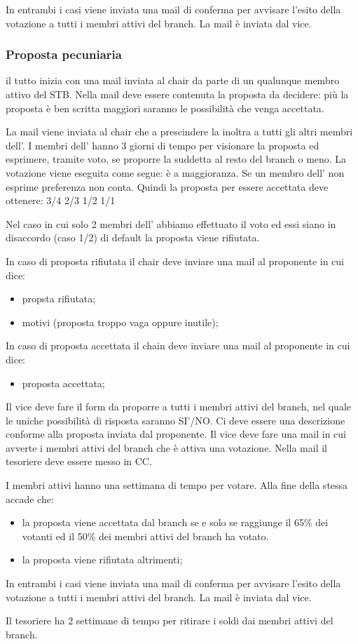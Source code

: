 \documentclass[pdf]{article}
\theoremstyle{definition}
\begin{document}
In entrambi i casi viene inviata una mail di conferma per  avvisare l'esito della votazione a tutti i membri attivi del branch. La mail è inviata dal vice.

\subsubsection{Proposta pecuniaria}

il tutto inizia con una mail inviata al chair da parte di un qualunque membro attivo del STB. Nella mail deve essere contenuta la proposta da decidere: più la proposta è ben scritta maggiori saranno le possibilità che venga accettata. 

La mail viene inviata al chair che a prescindere la inoltra a tutti gli altri membri dell'\EC{}. I membri dell'\EC{} hanno 3 giorni di tempo per visionare la proposta ed esprimere, tramite voto, se proporre la suddetta al resto del branch o meno.
La votazione viene eseguita come segue:
è a maggioranza. Se un membro dell'\EC{} non esprime preferenza non conta. Quindi la proposta per essere accettata deve ottenere:
3/4
2/3
1/2
1/1

Nel caso in cui solo 2 membri dell'\EC{} abbiamo effettuato il voto ed essi siano in disaccordo (caso 1/2) di default la proposta viene rifiutata.

In caso di proposta rifiutata il chair deve inviare una mail al proponente in cui dice:
\begin{itemize}
	\item propsta rifiutata;
	\item motivi (proposta troppo vaga oppure inutile);
\end{itemize}

In caso di proposta accettata il chain deve inviare una mail al proponente in cui dice:
\begin{itemize}
	\item proposta accettata;
\end{itemize}

Il vice deve fare il form da proporre a tutti i membri attivi del branch, nel quale le uniche possibilità di risposta saranno SI'/NO. Ci deve essere una descrizione conforme alla proposta inviata dal proponente. 
Il vice deve fare una mail in cui avverte i membri attivi del branch che è attiva una votazione. Nella mail il tesoriere deve essere messo in CC.

I membri attivi hanno una settimana di tempo per votare. Alla fine della stessa accade che:

\begin{itemize}
	\item la proposta viene accettata dal branch se e solo se raggiunge il 65\% dei votanti ed il 50\% dei membri attivi del branch ha votato.
	\item la proposta viene rifiutata altrimenti;
\end{itemize}

In entrambi i casi viene inviata una mail di conferma per  avvisare l'esito della votazione a tutti i membri attivi del branch. La mail è inviata dal vice.

Il tesoriere ha 2 settimane di tempo per ritirare i soldi dai membri attivi del branch.
\end{document}
